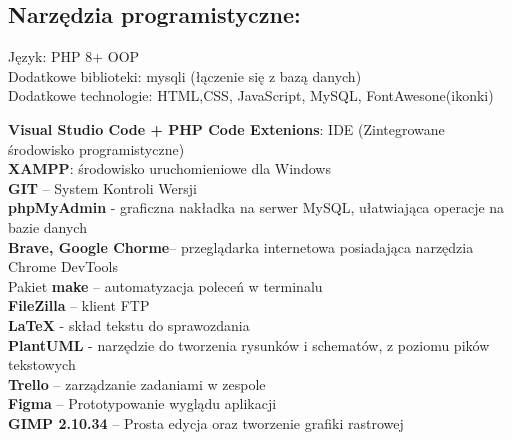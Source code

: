 \subsection{Narzędzia programistyczne:}
    \begin{flushleft}
        Język: PHP 8+ OOP \\
        Dodatkowe biblioteki: mysqli (łączenie się z bazą danych)\\
        Dodatkowe technologie: HTML,CSS, JavaScript, MySQL, FontAwesone(ikonki) \newline\newline

        \textbf{Visual Studio Code + PHP Code Extenions}: IDE (Zintegrowane środowisko programistyczne)\\
        \textbf{XAMPP}: środowisko uruchomieniowe dla Windows \\
        \textbf{GIT} – System Kontroli Wersji\\
        \textbf{phpMyAdmin} - graficzna nakładka na serwer MySQL, ułatwiająca operacje na bazie danych\\
        \textbf{Brave, Google Chorme}– przeglądarka internetowa posiadająca narzędzia Chrome DevTools \\
        Pakiet \textbf{make} – automatyzacja poleceń w terminalu\\
        \textbf{FileZilla} – klient FTP\\
        \textbf{LaTeX} - skład tekstu do sprawozdania\\
        \textbf{PlantUML} - narzędzie do tworzenia rysunków i schematów, z poziomu pików tekstowych\\
        \textbf{Trello} – zarządzanie zadaniami w zespole\\
        \textbf{Figma} – Prototypowanie wyglądu aplikacji \\
        \textbf{GIMP 2.10.34} – Prosta edycja oraz tworzenie grafiki rastrowej \\


    \end{flushleft}
\pagebreak

